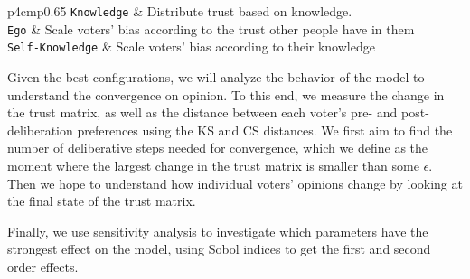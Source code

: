 \begin{table}
\begin{tabular}{p{4cm}p{0.65\linewidth }}
		\texttt{Knowledge}            & Distribute trust based on knowledge.                                                                                                             \\
		\texttt{Ego}                  & Scale voters' bias according to the trust other people have in them                                                                              \\
		\texttt{Self-Knowledge}       & Scale voters' bias according to their knowledge                                                                                                  \\
		\bottomrule
	\end{tabular}
	\caption{The parameters of the DeGroot learning based model, as well as their descriptions}
\end{table}

Given the best configurations, we will analyze the behavior of the model to
understand the convergence on opinion. To this end, we measure the change in the trust
matrix, as well as the distance between each voter's pre- and post-deliberation
preferences using the KS and CS distances. We first aim to find the number of
deliberative steps needed for convergence, which we define as the moment where
the largest change in the trust matrix is smaller than some $\epsilon$. Then we
hope to understand how individual voters' opinions change by looking at the
final state of the trust matrix.

Finally, we use sensitivity analysis to investigate which parameters have the
strongest effect on the model, using Sobol indices to get the first and second
order effects.

